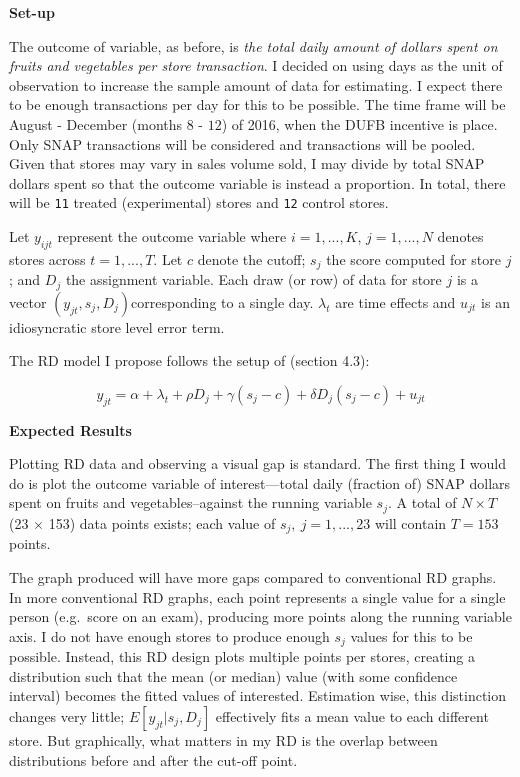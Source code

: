 \documentclass[12pt,letterpaperpaper,]{book}
\begin{document}
\textbf{Set-up}

The outcome of variable, as before, is \emph{the total daily amount of
dollars spent on fruits and vegetables per store transaction}. I decided
on using days as the unit of observation to increase the sample amount
of data for estimating. I expect there to be enough transactions per day
for this to be possible. The time frame will be August - December
(months \(8\) - \(12\)) of 2016, when the DUFB incentive is place. Only
SNAP transactions will be considered and transactions will be pooled.
Given that stores may vary in sales volume sold, I may divide by total
SNAP dollars spent so that the outcome variable is instead a proportion.
In total, there will be \texttt{11} treated (experimental) stores and
\texttt{12} control stores.

Let \(y_{ijt}\) represent the outcome variable where \(i=1,...,K\),
\(j=1,...,N\) denotes stores across \(t=1,...,T\). Let \(c\) denote the
cutoff; \(s_{j}\) the score computed for store \(j\); and \(D_{j}\) the
assignment variable. Each draw (or row) of data for store \(j\) is a
vector \((y_{jt}, s_{j}, D_{j})\)corresponding to a single day.
\(\lambda_t\) are time effects and \(u_{jt}\) is an idiosyncratic store
level error term.

The RD model I propose follows the setup of \citet{lee_regression_2010}
(section 4.3):

\[y_{jt} = \alpha + \lambda_t + \rho D_{j} + \gamma (s_{j} - c) + \delta D_{j}(s_{j} - c) + u_{jt}\]

\textbf{Expected Results}

Plotting RD data and observing a visual gap is standard. The first thing
I would do is plot the outcome variable of interest---total daily
(fraction of) SNAP dollars spent on fruits and vegetables--against the
running variable \(s_j\). A total of \(N \times T\) (23 \(\times\) 153)
data points exists; each value of \(s_j,~j=1,...,23\) will contain
\(T=153\) points.

The graph produced will have more gaps compared to conventional RD
graphs. In more conventional RD graphs, each point represents a single
value for a single person (e.g.~score on an exam), producing more points
along the running variable axis. I do not have enough stores to produce
enough \(s_j\) values for this to be possible. Instead, this RD design
plots multiple points per stores, creating a distribution such that the
mean (or median) value (with some confidence interval) becomes the
fitted values of interested. Estimation wise, this distinction changes
very little; \(E[y_{jt}|s_{j}, D_{j}]\) effectively fits a mean value to
each different store. But graphically, what matters in my RD is the
overlap between distributions before and after the cut-off point.
\end{document}
